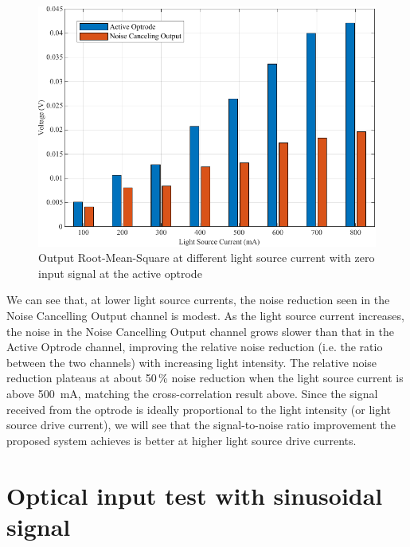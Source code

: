 \begin{figure}[h]
\centerline{\includegraphics[scale=1]{5-Experiment/RMS value for ch1 and DSP output.pdf}}
\caption{Output Root-Mean-Square at different light source current with zero input signal at the active optrode}
\label{fig_RMS value for ch1 and DSP output}
\end{figure}

We can see that, at lower light source currents, the noise reduction seen in the Noise Cancelling Output channel is modest.  As the light source current increases, the noise in the Noise Cancelling Output channel grows slower than that in the Active Optrode channel, improving the relative noise reduction (i.e. the ratio between the two channels) with increasing light intensity.  The relative noise reduction plateaus at about 50\,\% noise reduction when the light source current is above \qty{500}{mA}, matching the cross-correlation result above.  Since the signal received from the optrode is ideally proportional to the light intensity (or light source drive current), we will see that the signal-to-noise ratio improvement the proposed system achieves is better at higher light source drive currents. 

\section{Optical input test with sinusoidal signal}

